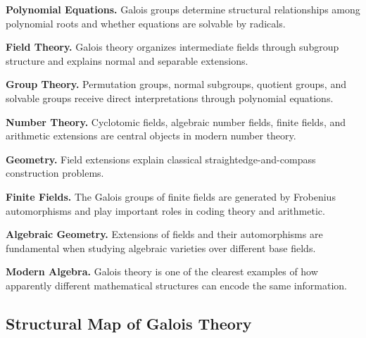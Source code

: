 \begin{applicationbox}
\textbf{Polynomial Equations.}
Galois groups determine structural relationships among polynomial roots and
whether equations are solvable by radicals.

\medskip

\textbf{Field Theory.}
Galois theory organizes intermediate fields through subgroup structure and
explains normal and separable extensions.

\medskip

\textbf{Group Theory.}
Permutation groups, normal subgroups, quotient groups, and solvable groups
receive direct interpretations through polynomial equations.

\medskip

\textbf{Number Theory.}
Cyclotomic fields, algebraic number fields, finite fields, and arithmetic
extensions are central objects in modern number theory.

\medskip

\textbf{Geometry.}
Field extensions explain classical straightedge-and-compass construction
problems.

\medskip

\textbf{Finite Fields.}
The Galois groups of finite fields are generated by Frobenius automorphisms
and play important roles in coding theory and arithmetic.

\medskip

\textbf{Algebraic Geometry.}
Extensions of fields and their automorphisms are fundamental when studying
algebraic varieties over different base fields.

\medskip

\textbf{Modern Algebra.}
Galois theory is one of the clearest examples of how apparently different
mathematical structures can encode the same information.
\end{applicationbox}

\subsection{Structural Map of Galois Theory}
\label{subsec:galois-structural-map}

